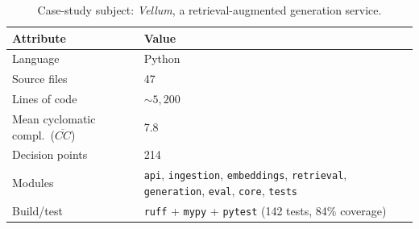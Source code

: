 \begin{table}[!htbp]
  \centering
  \caption{Case-study subject: \textit{Vellum}, a retrieval-augmented
           generation service.}
  \label{tab:subject}
  \renewcommand{\arraystretch}{1.15}
  \small
  \begin{tabularx}{\columnwidth}{@{}l X@{}}
    \toprule
    \textbf{Attribute} & \textbf{Value} \\
    \midrule
    Language              & Python \\
    Source files          & 47 \\
    Lines of code         & ${\sim}5{,}200$ \\
    Mean cyclomatic compl.\ ($\overline{CC}$) & 7.8 \\
    Decision points       & 214 \\
    Modules               & \texttt{api}, \texttt{ingestion},
                            \texttt{embeddings}, \texttt{retrieval},
                            \texttt{generation}, \texttt{eval},
                            \texttt{core}, \texttt{tests} \\
    Build/test            & \texttt{ruff} + \texttt{mypy} + \texttt{pytest}
                            (142 tests, 84\% coverage) \\
    \bottomrule
  \end{tabularx}
\end{table}
